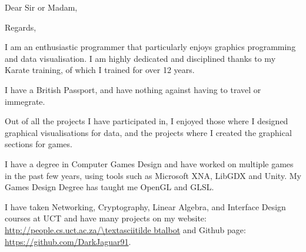 \documentclass[11pt,a4paper,sans]{moderncv}
\begin{document}
\clearpage

\opening{Dear Sir or Madam,}
\closing{Regards,}
\makelettertitle

I am an enthusiastic programmer that particularly enjoys graphics programming and data visualisation. I am highly dedicated and disciplined thanks to my Karate training, of which I trained for over 12 years.

I have a British Passport, and have nothing against having to travel or immegrate.

Out of all the projects I have participated in, I enjoyed those where I designed graphical visualisations for data, and the projects where I created the graphical sections for games.

I have a degree in Computer Games Design and have worked on multiple games in the past few years, using tools such as Microsoft XNA, LibGDX and Unity. My Games Design Degree has taught me OpenGL and GLSL.  

I have taken Networking, Cryptography, Linear Algebra, and Interface Design courses at UCT and have many projects on my website: \url{http://people.cs.uct.ac.za/\textasciitilde btalbot} and Github page: \url{https://github.com/DarkJaguar91}.


\makeletterclosing

\clearpage
\end{document}
